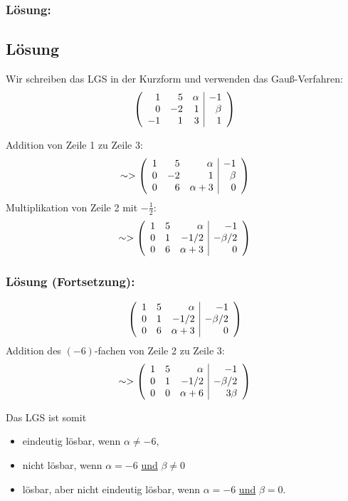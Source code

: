 \begin{frame}\frametitle{Lösung:}
%
\subsection*{L\"osung}
Wir schreiben das LGS in der Kurzform und verwenden das Gauß-Verfahren:
$$
	\left(
		\begin{array}{rrr | r}
			1	&5	&\alpha	&-1\\
			0	&-2	&1	&\beta\\
			-1	&1	&3	&1
		\end{array}
	\right)
$$\pause

Addition von Zeile 1 zu Zeile 3:
$$
	\sim>
	\left(
		\begin{array}{rrr | r}
			1	&5	&\alpha		&-1\\
			0	&-2	&1	&\beta\\
			0	&6	&\alpha+3	&0
		\end{array}
	\right)
$$\pause
Multiplikation von Zeile 2 mit $-\frac{1}{2}$:
$$
	\sim>
	\left(
		\begin{array}{rrr | r}
			1	&5	&\alpha		&-1\\
			0	&1	&-1/2	&-\beta/2\\
			0	&6	&\alpha+3	&0
		\end{array}
	\right)
$$
\end{frame}
%
\begin{frame}\frametitle{Lösung (Fortsetzung):}
$$
	\left(
		\begin{array}{rrr | r}
			1	&5	&\alpha		&-1\\
			0	&1	&-1/2	&-\beta/2\\
			0	&6	&\alpha+3	&0
		\end{array}
	\right)
$$\pause
Addition des $(-6)$-fachen von Zeile 2 zu Zeile 3:
$$
	\sim>
	\left(
		\begin{array}{rrr | r}
			1	&5	&\alpha		&-1\\
			0	&1	&-1/2	&-\beta/2\\
			0	&0	&\alpha+6	&3\beta
		\end{array}
	\right)
$$\pause

Das LGS ist somit
\begin{itemize}
	\item eindeutig l\"osbar, \pause wenn $\alpha\neq -6$,\pause
	\item nicht l\"osbar, \pause wenn $\alpha=-6$ \underline{und} $\beta\neq 0$\pause
	\item l\"osbar, aber nicht eindeutig l\"osbar, \pause wenn $\alpha=-6$ \underline{und} $\beta=0$.
\end{itemize}
\end{frame}


